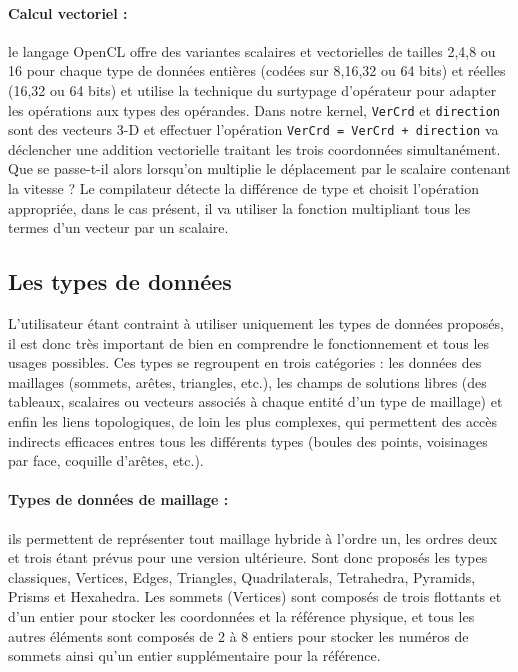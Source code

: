 \documentclass[a4paper,12pt]{article}
\begin{document}
\paragraph{Calcul vectoriel : } le langage OpenCL offre des variantes scalaires et vectorielles de tailles 2,4,8 ou 16 pour chaque type de données entières (codées sur 8,16,32 ou 64 bits) et réelles (16,32 ou 64 bits) et utilise la technique du surtypage d'opérateur pour adapter les opérations aux types des opérandes.
Dans notre kernel, {\tt VerCrd} et {\tt direction} sont des vecteurs 3-D et effectuer l'opération {\tt VerCrd = VerCrd + direction} va déclencher une addition vectorielle traitant les trois coordonnées simultanément.
Que se passe-t-il alors lorsqu'on multiplie le déplacement par le scalaire contenant la vitesse ?
Le compilateur détecte la différence de type et choisit l'opération appropriée, dans le cas présent, il va utiliser la fonction multipliant tous les termes d'un vecteur par un scalaire.


\subsection{Les types de données}

L'utilisateur étant contraint à utiliser uniquement les types de données proposés, il est donc très important de bien en comprendre le fonctionnement et tous les usages possibles.
Ces types se regroupent en trois catégories : les données des maillages (sommets, arêtes, triangles, etc.), les champs de solutions libres (des tableaux, scalaires ou vecteurs associés à chaque entité d'un type de maillage) et enfin les liens topologiques, de loin les plus complexes, qui permettent des accès indirects efficaces entres tous les différents types (boules des points, voisinages par face, coquille d'arêtes, etc.).

\paragraph{Types de données de maillage :} ils permettent de représenter tout maillage hybride à l'ordre un, les ordres deux et trois étant prévus pour une version ultérieure.
Sont donc proposés les types classiques, Vertices, Edges, Triangles, Quadrilaterals, Tetrahedra, Pyramids, Prisms et Hexahedra.
Les sommets (Vertices) sont composés de trois flottants et d'un entier pour stocker les coordonnées et la référence physique, et tous les autres éléments sont composés de 2 à 8 entiers pour stocker les numéros de sommets ainsi qu'un entier supplémentaire pour la référence.
\end{document}
